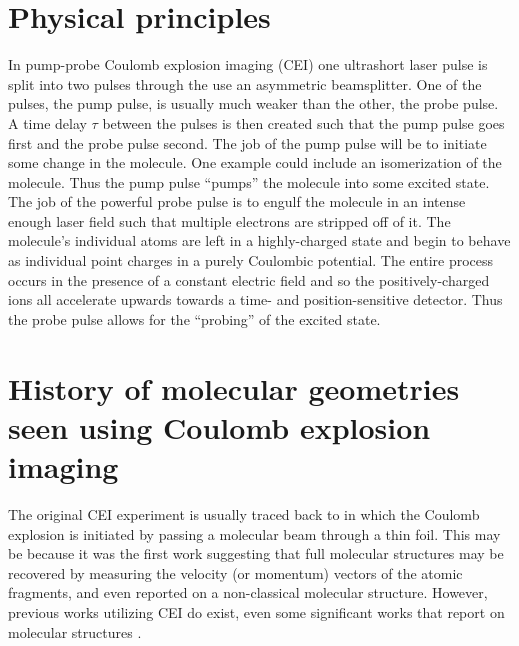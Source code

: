\section{Physical principles}\label{sec:CEIphysics}

In pump-probe Coulomb explosion imaging (CEI) one ultrashort laser pulse is split into two pulses through the use an asymmetric beamsplitter. One of the pulses, the pump pulse, is usually much weaker than the other, the probe pulse. A time delay $\tau$ between the pulses is then created such that the pump pulse goes first and the probe pulse second. The job of the pump pulse will be to initiate some change in the molecule. One example could include an isomerization of the molecule. Thus the pump pulse ``pumps'' the molecule into some excited state. The job of the powerful probe pulse is to engulf the molecule in an intense enough laser field such that multiple electrons are stripped off of it. The molecule's individual atoms are left in a highly-charged state and begin to behave as individual point charges in a purely Coulombic potential. The entire process occurs in the presence of a constant electric field and so the positively-charged ions all accelerate upwards towards a time- and position-sensitive detector. Thus the probe pulse allows for the ``probing'' of the excited state.


\section{History of molecular geometries seen using Coulomb explosion imaging}
The original CEI experiment is usually traced back to \citet{Vager89} in which the Coulomb explosion is initiated by passing a molecular beam through a thin foil. This may be because it was the first work suggesting that full molecular structures may be recovered by measuring the velocity (or momentum) vectors of the atomic fragments, and even reported on a non-classical molecular structure. However, previous works utilizing CEI do exist, even some significant works that report on molecular structures \citep{Kanter79}.

